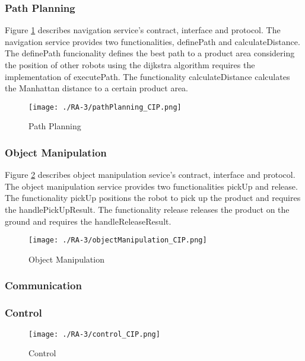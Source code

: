 \subsubsection{Path Planning} %
Figure \ref{fig:pathplanning_cip} describes navigation service's contract, interface and protocol. The navigation service provides two functionalities, definePath and calculateDistance. The definePath funcionality defines the best path to a product area considering the position of other robots using the dijkstra algorithm requires the implementation of executePath. The functionality calculateDistance calculates the Manhattan distance to a certain product area.
\begin{figure}[ht!]
 \centering
 \texttt{[image: ./RA-3/pathPlanning\_CIP.png]}
 \caption{Path Planning}
 \label{fig:pathplanning_cip}
\end{figure}

\subsubsection{Object Manipulation} %
Figure \ref{fig:objectmanipulation_cip} describes object manipulation sevice's contract, interface and protocol. The object manipulation service provides two functionalities pickUp and release. The functionality pickUp positions the robot to pick up the product and requires the handlePickUpResult. The functionality release releases the product on the ground and requires the handleReleaseResult. 
\begin{figure}[ht!]
 \centering
 \texttt{[image: ./RA-3/objectManipulation\_CIP.png]}
 \caption{Object Manipulation}
 \label{fig:objectmanipulation_cip}
\end{figure}

\subsubsection{Communication} %

\subsubsection{Control} %
\begin{figure}[ht!]
 \centering
 \texttt{[image: ./RA-3/control\_CIP.png]}
 \caption{Control}
 \label{fig:control_cip}
\end{figure}

